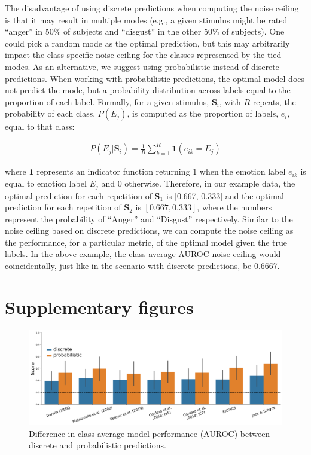 \documentclass[11pt,american,a4paper,oneside,]{memoir} %
\begin{document}
The disadvantage of using discrete predictions when computing the noise ceiling is that it may result in multiple modes (e.g., a given stimulus might be rated ``anger'' in 50\% of subjects and ``disgust'' in the other 50\% of subjects). One could pick a random mode as the optimal prediction, but this may arbitrarily impact the class-specific noise ceiling for the classes represented by the tied modes. As an alternative, we suggest using probabilistic instead of discrete predictions. When working with probabilistic predictions, the optimal model does not predict the mode, but a probability distribution across labels equal to the proportion of each label. Formally, for a given stimulus, \(\mathbf{S}_{i}\), with \(R\) repeats, the probability of each class, \(P(E_{j})\), is computed as the proportion of labels, \(e_{i}\), equal to that class:

\begin{align}
P(E_{j} | \mathbf{S}_{i}) = \frac{1}{R}\sum_{k=1}^{R} \boldsymbol{1}(e_{ik} = E_{j})
\end{align}

where \(\boldsymbol{1}\) represents an indicator function returning 1 when the emotion label \(e_{ik}\) is equal to emotion label \(E_{j}\) and 0 otherwise. Therefore, in our example data, the optimal prediction for each repetition of \(\mathbf{S}_{1}\) is {[}0.667, 0.333{]} and the optimal prediction for each repetition of \(\mathbf{S}_{2}\) is \([0.667, 0.333]\), where the numbers represent the probability of ``Anger'' and ``Disgust'' respectively. Similar to the noise ceiling based on discrete predictions, we can compute the noise ceiling as the performance, for a particular metric, of the optimal model given the true labels. In the above example, the class-average AUROC noise ceiling would coincidentally, just like in the scenario with discrete predictions, be 0.6667.

\hypertarget{hka-supp-fig}{%
\section{Supplementary figures}\label{hka-supp-fig}}

\begin{figure}
\centering
\includegraphics{_bookdown_files/hypothesis-kernel-analysis-files/figures/figure_S1.pdf}
\caption{\label{fig:fig-hka-S1}Difference in class-average model performance (AUROC) between discrete and probabilistic predictions.}
\end{figure}
\end{document}
